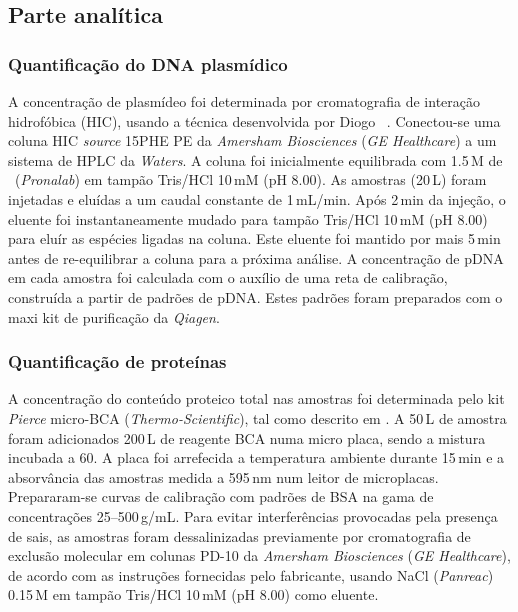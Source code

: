 \subsection{Parte analítica}
\label{subsec:2p3art3}
\subsubsection{Quantificação do DNA plasmídico}
\label{subsubsec:2p3p1art3}
A concentração de plasmídeo foi determinada por cromatografia de interação hidrofóbica (HIC), usan\-do a técnica desenvolvida por Diogo \et\ \cite{diogo}.
%
Conectou-se uma coluna HIC \emph{source} 15PHE PE da \emph{Amersham Biosciences} (\emph{GE Healthcare}) a um sistema de HPLC da \emph{Waters}.
%
%
A coluna foi inicialmente equilibrada com 1.5\,M de \sulfatoamonio\ (\emph{Pronalab}) em tampão Tris/HCl 10\,mM (pH 8.00).
%
As amostras (20\,\micro L) foram injetadas e eluídas a um caudal constante de 1\,mL/min. Após 2\,min da injeção, o eluente foi instantaneamente mudado para tampão Tris/HCl 10\,mM (pH 8.00) para eluír as espécies ligadas na coluna. Este eluente foi mantido por mais 5\,min antes de re-equilibrar a coluna para a próxima análise. A concentração de pDNA em cada amostra foi calculada com o auxílio de uma reta de calibração, construída a partir de padrões de pDNA.
%
Estes padrões foram preparados com o maxi kit de purificação da \emph{Qiagen}.

\subsubsection{Quantificação de proteínas}
%
A concentração do conteúdo proteico total nas amostras foi determinada pelo kit \emph{Pierce} micro-BCA (\emph{Thermo-Scientific}), tal como descrito em \cite{sousabab}. A 50\,\micro L de amostra foram adicionados 200\,\micro L de reagente BCA numa micro placa, sendo a mistura incubada a 60\degreecelsius. A placa foi arrefecida a temperatura ambiente durante 15\,min e a absorvância das amostras medida a 595\,nm num leitor de microplacas. Prepararam-se curvas de calibração com padrões de BSA na gama de concentrações 25--500\,\micro g/mL.
%
%
%
Para evitar interferências provocadas pela presença de sais, as amostras foram dessalinizadas previamente por cromatografia de exclusão molecular em colunas PD-10 da \emph{Amersham Biosciences} (\emph{GE Healthcare}), de acordo com as instruções fornecidas pelo fabricante, usando NaCl (\emph{Panreac}) 0.15\,M em tampão Tris/HCl 10\,mM (pH 8.00) como eluente.
%
%
% 

